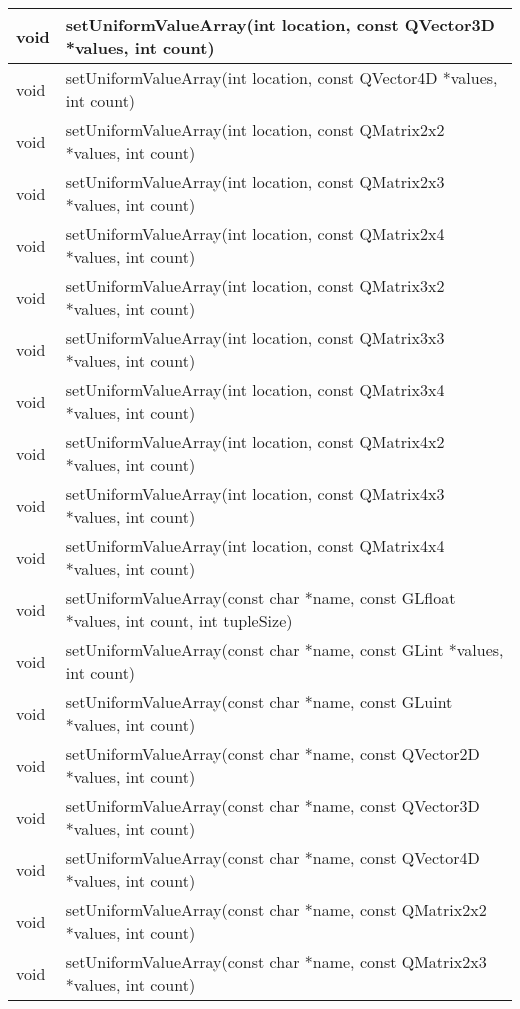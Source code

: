 \begin{longtable}[l]{|l|m{34em}|}
    \hline
    void	&setUniformValueArray(int location, const QVector3D *values, int count) \\ 
    \hline
    void	&setUniformValueArray(int location, const QVector4D *values, int count) \\ 
    \hline
    void	&setUniformValueArray(int location, const QMatrix2x2 *values, int count) \\ 
    \hline
    void	&setUniformValueArray(int location, const QMatrix2x3 *values, int count) \\ 
    \hline
    void	&setUniformValueArray(int location, const QMatrix2x4 *values, int count) \\ 
    \hline
    void	&setUniformValueArray(int location, const QMatrix3x2 *values, int count) \\ 
    \hline
    void	&setUniformValueArray(int location, const QMatrix3x3 *values, int count) \\ 
    \hline
    void	&setUniformValueArray(int location, const QMatrix3x4 *values, int count) \\ 
    \hline
    void	&setUniformValueArray(int location, const QMatrix4x2 *values, int count) \\ 
    \hline
    void	&setUniformValueArray(int location, const QMatrix4x3 *values, int count)  \\ 
    \hline
    void	&setUniformValueArray(int location, const QMatrix4x4 *values, int count) \\
    \hline
    void	&setUniformValueArray(const char *name, const GLfloat *values, int count, int tupleSize)\\
    \hline
    void&	setUniformValueArray(const char *name, const GLint *values, int count)\\
    \hline
    void&	setUniformValueArray(const char *name, const GLuint *values, int count)\\
    \hline
    void&	setUniformValueArray(const char *name, const QVector2D *values, int count) \\
    \hline
    void	&setUniformValueArray(const char *name, const QVector3D *values, int count) \\
    \hline
    void	&setUniformValueArray(const char *name, const QVector4D *values, int count)\\
    \hline
    void	&setUniformValueArray(const char *name, const QMatrix2x2 *values, int count)\\
    \hline
    void	&setUniformValueArray(const char *name, const QMatrix2x3 *values, int count)\\

\end{longtable}
